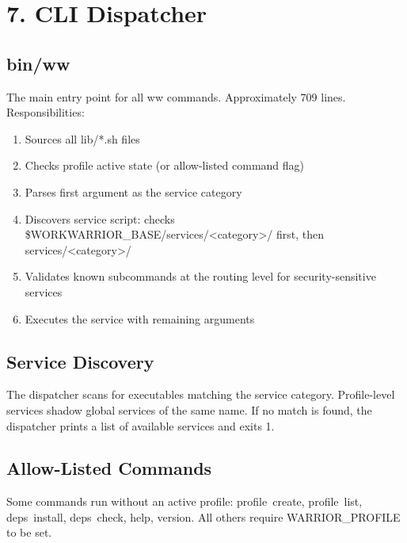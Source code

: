 \documentclass[11pt, a4paper, DIV=14]{scrartcl}
\renewcommand{\texttt}[1]{{\ttfamily\fontsize{8.5}{10.5}\selectfont\color{BabbNavy}#1}}
\begin{document}
\section{7. CLI Dispatcher}\label{cli-dispatcher}

\subsection{bin/ww}\label{binww}

The main entry point for all \texttt{ww} commands. Approximately 709
lines. Responsibilities:

\begin{enumerate}
\def\labelenumi{\arabic{enumi}.}
\tightlist
\item
  Sources all \texttt{lib/*.sh} files
\item
  Checks profile active state (or allow-listed command flag)
\item
  Parses first argument as the service category
\item
  Discovers service script: checks
  \texttt{\$WORKWARRIOR\_BASE/services/\textless{}category\textgreater{}/}
  first, then \texttt{services/\textless{}category\textgreater{}/}
\item
  Validates known subcommands at the routing level for
  security-sensitive services
\item
  Executes the service with remaining arguments
\end{enumerate}

\subsection{Service Discovery}\label{service-discovery}

The dispatcher scans for executables matching the service category.
Profile-level services shadow global services of the same name. If no
match is found, the dispatcher prints a list of available services and
exits 1.

\subsection{Allow-Listed Commands}\label{allow-listed-commands}

Some commands run without an active profile: \texttt{profile\ create},
\texttt{profile\ list}, \texttt{deps\ install}, \texttt{deps\ check},
\texttt{help}, \texttt{version}. All others require
\texttt{WARRIOR\_PROFILE} to be set.
\end{document}
